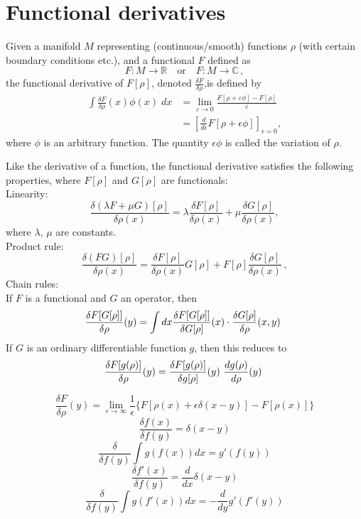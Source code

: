 \section{Functional derivatives}
\begin{newdef}
	Given a manifold $M$ representing (continuous/smooth) functions $\rho$ (with certain boundary conditions etc.), and a functional $F$ defined as
	\[F\colon M\rightarrow \mathbb {R} \quad {\mbox{or}}\quad F\colon M\rightarrow \mathbb {C} \,,\]
	the functional derivative of $F[\rho]$, denoted $\frac{\delta F}{\delta \rho}$,is defined by
	\[{\begin{aligned}\int {\frac {\delta F}{\delta \rho }}(x)\phi (x)\;dx&=\lim _{\varepsilon \to 0}{\frac {F[\rho +\varepsilon \phi ]-F[\rho ]}{\varepsilon }}\\&=\left[{\frac {d}{d\epsilon }}F[\rho +\epsilon \phi ]\right]_{\epsilon =0},\end{aligned}}\]
	where $\phi$ is an arbitrary function. The quantity $\epsilon \phi$ is called the variation of $\rho$. 
\end{newdef}
\noindent
Like the derivative of a function, the functional derivative satisfies the following properties, where $F[\rho]$ and $G[\rho]$ are functionals:\\
Linearity:
\[{\frac {\delta (\lambda F+\mu G)[\rho ]}{\delta \rho (x)}}=\lambda {\frac {\delta F[\rho ]}{\delta \rho (x)}}+\mu {\frac {\delta G[\rho ]}{\delta \rho (x)}},\]
where $\lambda$, $\mu$ are constants.\\
Product rule:
\[{\frac {\delta (FG)[\rho ]}{\delta \rho (x)}}={\frac {\delta F[\rho ]}{\delta \rho (x)}}G[\rho ]+F[\rho ]{\frac {\delta G[\rho ]}{\delta \rho (x)}}\,,\]
Chain rules:\\
If $F$ is a functional and $G$ an operator, then
\[{\displaystyle \displaystyle {\frac {\delta F[G[\rho ]]}{\delta \rho }(y)}=\int dx{\frac {\delta F[G[\rho]]}{\delta G[\rho]}}(x)\cdot {\frac {\delta G[\rho ]}{\delta \rho}(x,y)}\ }\]
If $G$ is an ordinary differentiable function $g$, then this reduces to
\[{\displaystyle \displaystyle {\frac {\delta F[g(\rho )]}{\delta \rho}(y)}={\frac {\delta F[g(\rho )]}{\delta g[\rho ]}(y)}\ {\frac {dg(\rho )}{d\rho }(y)}\ } \]
\begin{newprop}
	\[\frac{\delta F}{\delta \rho} (y) = \lim_{\epsilon \to \infty} \frac{1}{\epsilon} \{ F[\rho(x) + \epsilon \delta(x-y)] - F[\rho(x)] \}\]
	\[\frac{\delta f(x)}{\delta f(y)} = \delta(x-y)\]
	\[\frac{\delta}{\delta f(y)} \int g\left( f(x)\right) dx =  g'(f(y))\]
	\[\frac{\delta f'(x)}{\delta f(y)} = \frac{d}{dx}\delta(x-y)\]
	\[\frac{\delta}{\delta f(y)} \int g\left( f'(x)\right) dx = -\frac{d}{dy} g'(f'(y))\]
\end{newprop}

